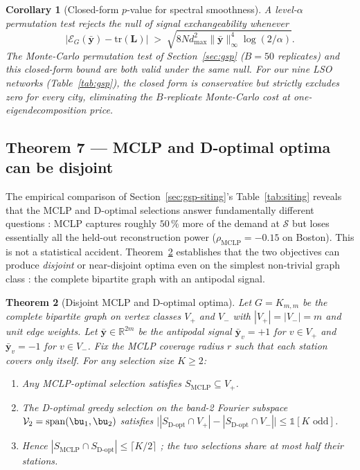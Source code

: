 \documentclass[11pt,a4paper]{article}
\newcommand{\tr}{\mathrm{tr}}
\newcommand{\1}{\mathbb{1}}
\newcommand{\by}{\bar{\mathbf{y}}}
\newcommand{\Lcomb}{\mathbf{L}}
\theoremstyle{plain}
\newtheorem{theorem}{Theorem}
\newtheorem{corollary}[theorem]{Corollary}
\theoremstyle{definition}
\theoremstyle{remark}
\begin{document}
\begin{corollary}[Closed-form $p$-value for spectral smoothness]
\label{cor:closed-form-p}
A level-$\alpha$ permutation test rejects the null of signal
exchangeability whenever
\[
    \big| \mathcal{E}_G(\by) - \tr(\Lcomb) \big|
    \;>\; \sqrt{8 N d_{\max}^2 \| \by \|_\infty^4 \log(2/\alpha)}.
\]
The Monte-Carlo permutation test of Section~\ref{sec:gsp}
($B = 50$ replicates) and this closed-form bound are both valid
under the same null.  For our nine LSO networks
(Table~\ref{tab:gsp}), the closed form is conservative but
strictly excludes zero for every city, eliminating the
$B$-replicate Monte-Carlo cost at one-eigendecomposition price.
\end{corollary}

\subsection{Theorem 7 --- MCLP and D-optimal optima can be disjoint}

The empirical comparison of Section~\ref{sec:gsp-siting}'s
Table~\ref{tab:siting} reveals that the MCLP and D-optimal
selections answer fundamentally different questions : MCLP
captures roughly $50\,\%$ more of the demand at $\mathcal{S}$ but
loses essentially all the held-out reconstruction power
($\rho_\mathrm{MCLP} = -0.15$ on Boston).  This is not a
statistical accident.  Theorem~\ref{thm:disjoint} establishes
that the two objectives can produce \emph{disjoint} or
near-disjoint optima even on the simplest non-trivial graph
class : the complete bipartite graph with an antipodal signal.

\begin{theorem}[Disjoint MCLP and D-optimal optima]
\label{thm:disjoint}
Let $G = K_{m,m}$ be the complete bipartite graph on vertex
classes $V_+$ and $V_-$ with $|V_+| = |V_-| = m$ and unit edge
weights.  Let $\by \in \mathbb{R}^{2m}$ be the antipodal signal
$\by_v = +1$ for $v \in V_+$ and $\by_v = -1$ for $v \in V_-$.
Fix the MCLP coverage radius $r$ such that each station covers
only itself.  For any selection size $K \geq 2$:
\begin{enumerate}[label=(\roman*),leftmargin=*]
    \item Any MCLP-optimal selection satisfies
          $S_{\mathrm{MCLP}} \subseteq V_+$.
    \item The D-optimal greedy selection on the band-2 Fourier
          subspace $\mathcal{V}_2 = \mathrm{span}(\bu_1, \bu_2)$
          satisfies
          $\bigl| |S_{\mathrm{D\text{-}opt}} \cap V_+|
                 - |S_{\mathrm{D\text{-}opt}} \cap V_-| \bigr|
                 \leq \mathbb{1}[K \text{ odd}]$.
    \item Hence
          $|S_{\mathrm{MCLP}} \cap S_{\mathrm{D\text{-}opt}}|
          \leq \lceil K / 2 \rceil$ ; the two selections share
          at most half their stations.
\end{enumerate}
\end{theorem}
\end{document}
